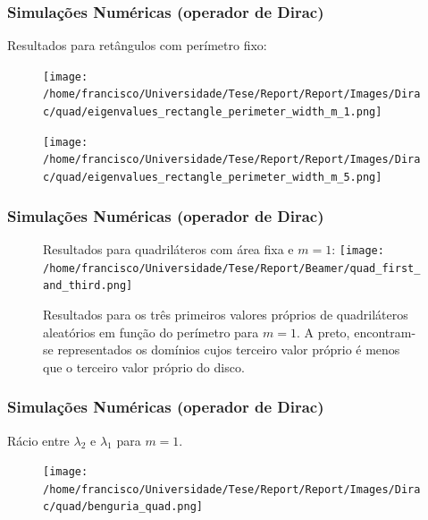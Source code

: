 \documentclass[portuguese,notheorems]{beamer}
\begin{document}
\begin{frame}\frametitle{Simulações Numéricas (operador de Dirac)}
    \centering Resultados para retângulos com perímetro fixo:
\begin{figure}
    \centering
    \begin{minipage}{.52\textwidth}
      \centering
      \texttt{[image: /home/francisco/Universidade/Tese/Report/Report/Images/Dirac/quad/eigenvalues\_rectangle\_perimeter\_width\_m\_1.png]}
      \captionsetup{width=0.9\linewidth} %
    \end{minipage}%
    \begin{minipage}{.52\textwidth}
      \centering
      \texttt{[image: /home/francisco/Universidade/Tese/Report/Report/Images/Dirac/quad/eigenvalues\_rectangle\_perimeter\_width\_m\_5.png]}
      \captionsetup{width=0.9\linewidth} %
    \end{minipage}
\end{figure}
\end{frame}


\begin{frame}\frametitle{Simulações Numéricas (operador de Dirac)}
    \begin{figure}
    \centering Resultados para quadriláteros com área fixa e $m=1$:
        \centering
        \texttt{[image: /home/francisco/Universidade/Tese/Report/Beamer/quad\_first\_and\_third.png]}
        \caption{Resultados para os três primeiros valores próprios de quadriláteros aleatórios em função do perímetro para $m=1$. A preto, encontram-se representados os domínios cujos terceiro valor próprio é menos que o terceiro valor próprio do disco.}
    \end{figure}
\end{frame}

\begin{frame}\frametitle{Simulações Numéricas (operador de Dirac)}
    \centering Rácio entre $\lambda_2$ e $\lambda_1$ para $m=1$.
\begin{figure}
    \centering
      \texttt{[image: /home/francisco/Universidade/Tese/Report/Report/Images/Dirac/quad/benguria\_quad.png]}
      \captionsetup{width=0.9\linewidth} %
\end{figure}
\end{frame}
\end{document}
